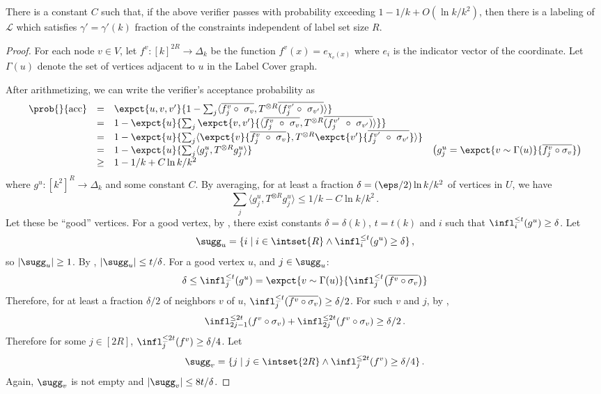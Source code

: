 %
\begin{lemma}[Soundness]
\label{lem:kcol-soundness}
  There is a constant $C$ such that, if the above verifier passes with
  probability exceeding $1-1/k+O(\ln k/k^2)$, then there
  is a labeling of $\mathcal{L}$ which satisfies $\gamma'=\gamma'(k)$
  fraction of the constraints independent of label set size $R$.
\end{lemma}
%
\begin{proof}
  For each node $v \in V$, let $f^v:[k]^{2 R} \rightarrow \Delta_k$ be
  the function $f^v(x) = e_{\chi_v(x)}$ where $e_i$
%
is the indicator
  vector of the  coordinate. Let $\Gamma(u)$ denote
  the set of vertices adjacent to $u$ in the Label Cover graph.

  After arithmetizing, we can write the verifier's acceptance probability as
%
%
  \[
    \begin{array}{rclr}
      \prob{}{\text{acc}} &=&
      \expct{u,v,v'} {1-
        \sum_j \langle \overline{f^v_j \circ\ \sigma_v},
        T^{\otimes R} \overline{(f^{v'}_j \circ\ \sigma_{v'})}\rangle} \\
      &=& 1 - \expct{u}{\sum_j \expct{v,v'} {
          \langle \overline{f^v_j\ \circ\ \sigma_v},
          T^{\otimes R} \overline{(f^{v'}_j\ \circ\ \sigma_{v'})}\rangle}} \\
      &=& 1 - \expct{u} {\sum_j
        \langle \expct{v}{\overline{f^v_j\ \circ\ \sigma_v}},
        T^{\otimes R} \expct{v'}{
          \overline{f^{v'}_j\ \circ\ \sigma_{v'}}}\rangle} \\
      &=& 1 - \expct{u} {
        \sum_j\langle g^u_j, T^{\otimes R} g^u_j\rangle} & 
      \left(g^u_j = \expct{v\sim \Gamma(u)}
        {\overline{f^v_j\circ \sigma_v}}\right)\\
      &\ge& 1 - 1/k + C \ln k/k^2 
    \end{array}
    \] where $g^u:[k^2]^{R}\to \Delta_{k}$ and some constant $C$.
    By averaging, for at least a fraction $\delta=(\eps/2) \ln k/k^2$
    of vertices in $U$, we have
    \[
    \sum_j\langle g^u_j, T^{\otimes R} g^u_j\rangle \le 1/k-C \ln
    k/k^2\,.\]
    Let these be ``good'' vertices. For a good vertex, by , there exist constants $\delta=\delta(k)$,
    $t=t(k)$ and $i$ such that $\infl_i^{\le t}(g^u)\ge\delta$. Let
    \[\sugg_u = \{i\mid i\in \intset{R}\wedge \infl_{i}^{\le t} (g^u)\ge
    \delta\}\,,\] so $|\sugg_u|\ge 1$. By , $|\sugg_u|\le t/\delta$. For a good
    vertex $u$, and $j\in\sugg_u$:
    \[ \delta \le \infl_j^{\le t} (g^u) = \expct{v \sim
      \Gamma(u)}{\infl_{j}^{\le t} \bigl( \overline{f^v \circ \sigma_v} \bigr)} \] 
    Therefore, for at least a fraction $\delta/2$ of neighbors $v$ of
    $u$, $\infl^{\le t}_{j}(\overline{f^v \circ \sigma_v}) \ge
    \delta/2$.  For such $v$ and $j$, by ,
    \[
\infl_{2j-1}^{\le 2t} (f^v\circ \sigma_v) + \infl_{2j}^{\le 2t}
    (f^v\circ \sigma_v) \ge \delta/2\,.
\] Therefore for some $j\in[2 R]$,
    $\infl_j^{\le 2t} (f^v) \ge \delta/4$. Let \[\sugg_v = \{j\mid j\in
    \intset{2 R}\wedge \infl_{j}^{\le 2t} (f^v)\ge \delta/4\}\,.\] Again,
    $\sugg_v$ is not empty and $|\sugg_v|\le 8 t/\delta$.


\end{proof}
